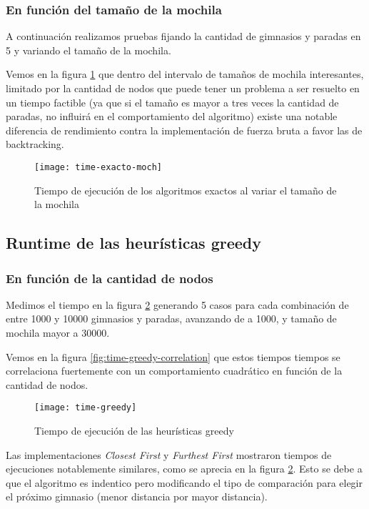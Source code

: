 \subsubsection{En función del tamaño de la mochila}

A continuación realizamos pruebas fijando la cantidad de gimnasios y paradas en 5 y variando el tamaño de la mochila.

Vemos en la figura \ref{fig:time-exacto-moch} que dentro del intervalo de tamaños de mochila
interesantes, limitado por la cantidad de nodos que puede tener un problema a ser resuelto en un tiempo factible
(ya que si el tamaño es mayor a tres veces la cantidad de paradas, no influirá en el comportamiento del algoritmo) existe una notable diferencia de rendimiento contra la implementación de fuerza bruta a favor las de backtracking.

\begin{figure}[H]
    \centering
    \texttt{[image: time-exacto-moch]}
    \caption{Tiempo de ejecución de los algoritmos exactos al variar el tamaño de la mochila}
    \label{fig:time-exacto-moch}
\end{figure}

\subsection{Runtime de las heurísticas greedy}

\subsubsection{En función de la cantidad de nodos}

Medimos el tiempo en la figura \ref{fig:time-greedy} generando 5 casos para cada combinación de entre 1000 y 10000 gimnasios y paradas, avanzando de a 1000, y tamaño de mochila mayor a 30000.

Vemos en la figura \ref{fig:time-greedy-correlation} que estos tiempos tiempos se correlaciona fuertemente con un comportamiento cuadrático en función de la cantidad de nodos.

\begin{figure}[H]
    \centering
    \texttt{[image: time-greedy]}
    \caption{Tiempo de ejecución de las heurísticas greedy}
    \label{fig:time-greedy}
\end{figure}

Las implementaciones \emph{Closest First} y \emph{Furthest First} mostraron tiempos de ejecuciones notablemente similares, como se aprecia en la figura \ref{fig:time-greedy}. Esto se debe a que el algoritmo es indentico pero modificando el tipo de comparación para elegir el próximo gimnasio (menor distancia por mayor distancia).

